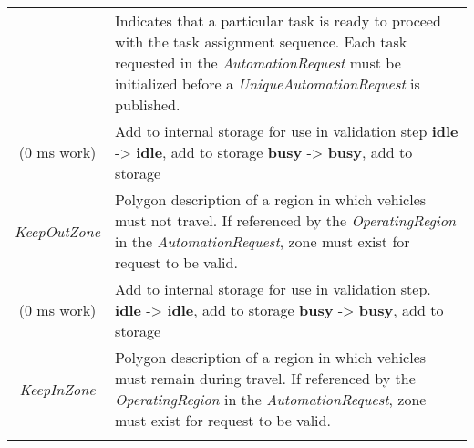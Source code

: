 \begin{longtable}[]{@{}cl@{}}
\begin{minipage}[t]{0.4\columnwidth}
\end{minipage} & \begin{minipage}[t]{0.55\columnwidth}\raggedright\strut
Indicates that a particular task is ready to proceed with the task
assignment sequence. Each task requested in the \emph{AutomationRequest}
must be initialized before a \emph{UniqueAutomationRequest} is
published.\strut
\end{minipage}\tabularnewline
\begin{minipage}[t]{0.4\columnwidth}\centering\strut
(0 ms work)\strut
\end{minipage} & \begin{minipage}[t]{0.55\columnwidth}\raggedright\strut
Add to internal storage for use in validation step \textbf{idle}
-\textgreater{} \textbf{idle}, add to storage \textbf{busy}
-\textgreater{} \textbf{busy}, add to storage\strut
\end{minipage}\tabularnewline
\begin{minipage}[t]{0.4\columnwidth}\centering\strut
\emph{KeepOutZone}\strut
\end{minipage} & \begin{minipage}[t]{0.55\columnwidth}\raggedright\strut
Polygon description of a region in which vehicles must not travel. If
referenced by the \emph{OperatingRegion} in the
\emph{AutomationRequest}, zone must exist for request to be valid.\strut
\end{minipage}\tabularnewline
\begin{minipage}[t]{0.4\columnwidth}\centering\strut
(0 ms work)\strut
\end{minipage} & \begin{minipage}[t]{0.55\columnwidth}\raggedright\strut
Add to internal storage for use in validation step. \textbf{idle}
-\textgreater{} \textbf{idle}, add to storage \textbf{busy}
-\textgreater{} \textbf{busy}, add to storage\strut
\end{minipage}\tabularnewline
\begin{minipage}[t]{0.4\columnwidth}\centering\strut
\emph{KeepInZone}\strut
\end{minipage} & \begin{minipage}[t]{0.55\columnwidth}\raggedright\strut
Polygon description of a region in which vehicles must remain during
travel. If referenced by the \emph{OperatingRegion} in the
\emph{AutomationRequest}, zone must exist for request to be valid.\strut
\end{minipage}\tabularnewline
\begin{minipage}[t]{0.4\columnwidth}\centering\strut

\end{minipage}
\end{longtable}
